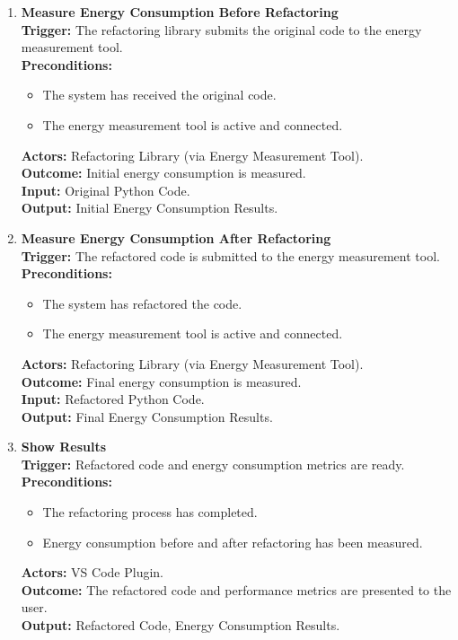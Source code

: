 \documentclass[12pt]{article}
\begin{document}
\begin{enumerate}[label={\bf PUC \arabic*:}, wide=0pt, font=\itshape]
  \item \textbf{Measure Energy Consumption Before Refactoring} \\[2mm]
    \textbf{Trigger:} The refactoring library submits the original
    code to the energy measurement tool. \\[2mm]
    \textbf{Preconditions:}
    \begin{itemize}
      \item The system has received the original code.
      \item The energy measurement tool is active and connected.
    \end{itemize}
    \textbf{Actors:} Refactoring Library (via Energy Measurement Tool). \\
    \textbf{Outcome:} Initial energy consumption is measured. \\
    \textbf{Input:} Original Python Code. \\
    \textbf{Output:} Initial Energy Consumption Results.

  \item \textbf{Measure Energy Consumption After Refactoring} \\[2mm]
    \textbf{Trigger:} The refactored code is submitted to the energy
    measurement tool. \\[2mm]
    \textbf{Preconditions:}
    \begin{itemize}
      \item The system has refactored the code.
      \item The energy measurement tool is active and connected.
    \end{itemize}
    \textbf{Actors:} Refactoring Library (via Energy Measurement Tool). \\
    \textbf{Outcome:} Final energy consumption is measured. \\
    \textbf{Input:} Refactored Python Code. \\
    \textbf{Output:} Final Energy Consumption Results.

  \item \textbf{Show Results} \\[2mm]
    \textbf{Trigger:} Refactored code and energy consumption metrics
    are ready. \\[2mm]
    \textbf{Preconditions:}
    \begin{itemize}
      \item The refactoring process has completed.
      \item Energy consumption before and after refactoring has been measured.
    \end{itemize}
    \textbf{Actors:} VS Code Plugin. \\
    \textbf{Outcome:} The refactored code and performance metrics are
    presented to the user. \\
    \textbf{Output:} Refactored Code, Energy Consumption Results.


\end{enumerate}
\end{document}
